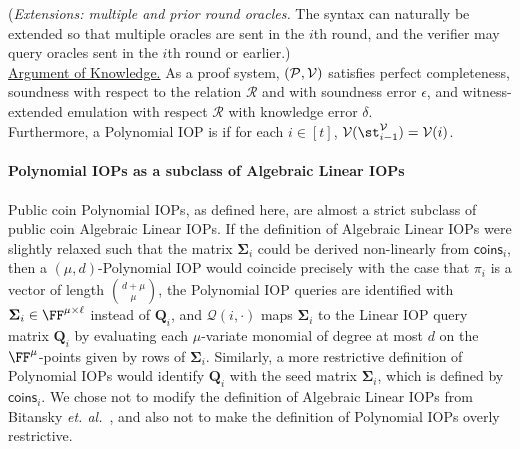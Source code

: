 \begin{definition}
(\emph{Extensions: multiple and prior round oracles.} The syntax can naturally be extended so that multiple oracles are sent in the $i$th round, and the verifier may query oracles sent in the $i$th round or earlier.) \\ 

\noindent \underline{Argument of Knowledge.} As a proof system, $(\mathcal{P}, \mathcal{V})$ satisfies perfect completeness, soundness with respect to the relation $\mathcal{R}$ and with soundness error $\epsilon$, and witness-extended emulation with respect $\mathcal{R}$ with knowledge error $\delta$. \\

Furthermore, a Polynomial IOP is  if for each $i \in [t]$, $\mathcal{V}(\st^\verifier_{i-1}) = \mathcal{V}(i)$. 
\end{definition}

\paragraph{Polynomial IOPs as a subclass of Algebraic Linear IOPs}
Public coin Polynomial IOPs, as defined here, are almost a strict subclass of public coin Algebraic Linear IOPs. If the definition of Algebraic Linear IOPs were slightly relaxed such that the matrix $\boldsymbol{\Sigma}_i$ could be derived non-linearly from $\textsf{coins}_i$, then a $(\mu, d)$-Polynomial IOP would coincide precisely with the case that $\pi_i$ is a vector of length ${d+\mu \choose \mu}$, the Polynomial IOP queries are identified with $\boldsymbol{\Sigma}_i \in \FF^{\mu \times \ell}$ instead of $\mathbf{Q}_i$, and $\mathcal{Q}(i, \cdot)$ maps $\boldsymbol{\Sigma}_i$ to the Linear IOP query matrix $\mathbf{Q}_i$ by evaluating each $\mu$-variate monomial of degree at most $d$ on the $\FF^\mu$-points given by rows of $\boldsymbol{\Sigma}_i$. Similarly, a more restrictive definition of Polynomial IOPs would identify $\mathbf{Q}_i$ with the seed matrix $\boldsymbol{\Sigma}_i$, which is defined by $\textsf{coins}_i$. We chose not to modify the definition of Algebraic Linear IOPs from Bitansky \emph{et. al.}~\cite{TCC:BCIOP13}, and also not to make the definition of Polynomial IOPs overly restrictive.

